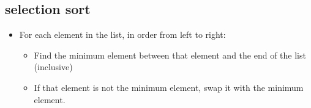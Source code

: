 {{  \subsection*{selection sort}
  \begin{itemize}
    \item For each element in the list, in order from left to right:
      \begin{itemize}
        \item Find the minimum element between that element and the end of the
          list (inclusive)
        \item If that element is not the minimum element, swap it with the
          minimum element.
      \end{itemize}
  \end{itemize}

  \inputminted{cpp}{\docCodeDir/.searching-1.cpp.gen.section.selection-sort}
}}

\textQuestion{\makePageQuadrilleRuled}

\newpage


